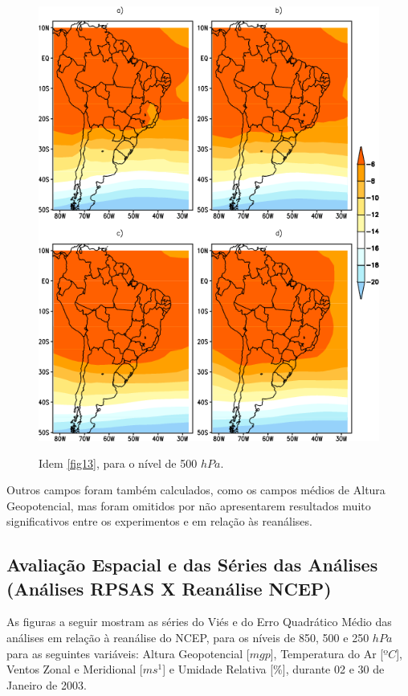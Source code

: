 \begin{figure}[!hbp]
\centering
\includegraphics[height=15cm]{./figs/media_temp_anl_500hPa.png}
\caption{Idem \autoref{fig13}, para o nível de 500 $hPa$.}
\label{fig21}
\end{figure}

Outros campos foram também calculados, como os campos médios de Altura Geopotencial, mas foram omitidos por não apresentarem resultados muito significativos entre os experimentos e em relação às reanálises.

\subsection{Avaliação Espacial e das Séries das Análises (Análises RPSAS X Reanálise NCEP)}
\label{ss:avalesanl}

As figuras a seguir mostram as séries do Viés e do Erro Quadrático Médio das análises em relação à reanálise do NCEP, para os níveis de 850, 500 e 250 $hPa$ para as seguintes variáveis: Altura Geopotencial [$mgp$], Temperatura do Ar [$ºC$], Ventos Zonal e Meridional [$ms^{1}$] e Umidade Relativa [$\%$], durante 02 e 30 de Janeiro de 2003.

